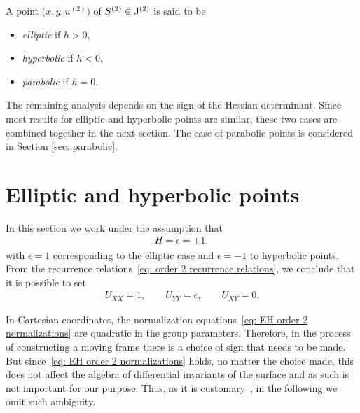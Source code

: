 \documentclass[10pt,a4paper]{amsart}
\numberwithin{equation}{section}
\newcommand{\J}{{\rm J}}
\begin{document}
\begin{Definition}
A point $\big(x,y,u^{(2)}\big)$ of $S^{(2)} \in \J^{(2)}$ is said to be
\begin{itemize}
\item \emph{elliptic} if $h>0$,
\item \emph{hyperbolic} if $h<0$,
\item \emph{parabolic} if $h=0$.
\end{itemize}
\end{Definition}

The remaining analysis depends on the sign of the Hessian determinant. Since most results for elliptic and hyperbolic points are similar, these two cases are combined together in the next section. The case of parabolic points is considered in Section \ref{sec: parabolic}.


\section{Elliptic and hyperbolic points}\label{sec:elliptic-hyperbolic}

In this section we work under the assumption that
\begin{gather*}
H = \epsilon = \pm 1,
\end{gather*}
with $\epsilon=1$ corresponding to the elliptic case and $\epsilon = -1$ to hyperbolic points. From the recurrence relations~\eqref{eq: order 2 recurrence relations}, we conclude that it is possible to set
%
\begin{gather}\label{eq: EH order 2 normalizations}
U_{XX} = 1,\qquad U_{YY} = \epsilon,\qquad U_{XY}=0.
\end{gather}

\begin{Remark}\label{remark:ambiguity}
In Cartesian coordinates, the normalization equations~\eqref{eq: EH order 2 normalizations} are quadratic in the group parameters. Therefore, in the process of constructing a moving frame there is a choice of sign that needs to be made. But since~\eqref{eq: EH order 2 normalizations} holds, no matter the choice made, this does not affect the algebra of differential invariants of the surface and as such is not important for our purpose. Thus, as it is customary~\cite{O-2016}, in the following we omit such ambiguity.
\end{Remark}
\end{document}
